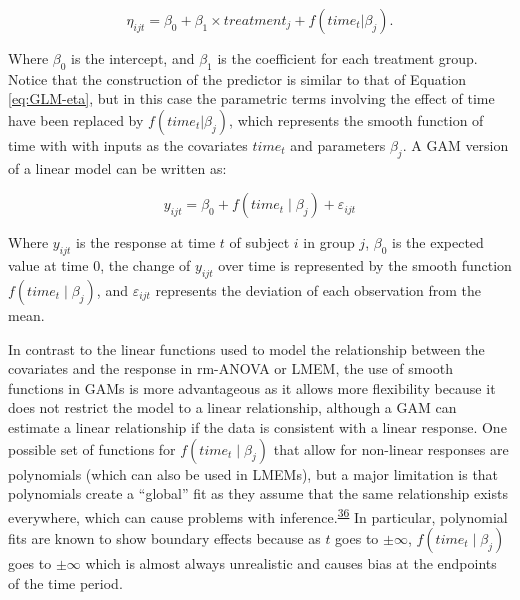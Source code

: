 \documentclass[
]{article}
\begin{document}
\begin{equation}
\eta_{ijt}=\beta_{0}+ \beta_{1} \times treatment_{j} +f(time_{t}|\beta_{j}).
\label{eq:GAM-eta}
\end{equation}

Where \(\beta_{0}\) is the intercept, and \(\beta_{1}\) is the coefficient for each treatment group. Notice that the construction of the predictor is similar to that of Equation \eqref{eq:GLM-eta}, but in this case the parametric terms involving the effect of time have been replaced by \(f(time_{t}|\beta_{j})\), which represents the smooth function of time with with inputs as the covariates \(time_t\) and parameters \(\beta_{j}\). A GAM version of a linear model can be written as:

\begin{equation}
  y_{ijt}=\beta_0+f(time_t\mid \beta_j)+\varepsilon_{ijt}
  \label{eq:GAM}
\end{equation}

Where \(y_{ijt}\) is the response at time \(t\) of subject \(i\) in group \(j\), \(\beta_0\) is the expected value at time 0, the change of \(y_{ijt}\) over time is represented by the smooth function \(f(time_t\mid \beta_j)\), and \(\varepsilon_{ijt}\) represents the deviation of each observation from the mean.

In contrast to the linear functions used to model the relationship between the covariates and the response in rm-ANOVA or LMEM, the use of smooth functions in GAMs is more advantageous as it allows more flexibility because it does not restrict the model to a linear relationship, although a GAM can estimate a linear relationship if the data is consistent with a linear response. One possible set of functions for \(f(time_t\mid \beta_j)\) that allow for non-linear responses are polynomials (which can also be used in LMEMs), but a major limitation is that polynomials create a ``global'' fit as they assume that the same relationship exists everywhere, which can cause problems with inference.\textsuperscript{\protect\hyperlink{ref-beck1998}{36}} In particular, polynomial fits are known to show boundary effects because as \(t\) goes to \(\pm \infty\), \(f(time_t \mid \beta_j)\) goes to \(\pm \infty\) which is almost always unrealistic and causes bias at the endpoints of the time period.
\end{document}
